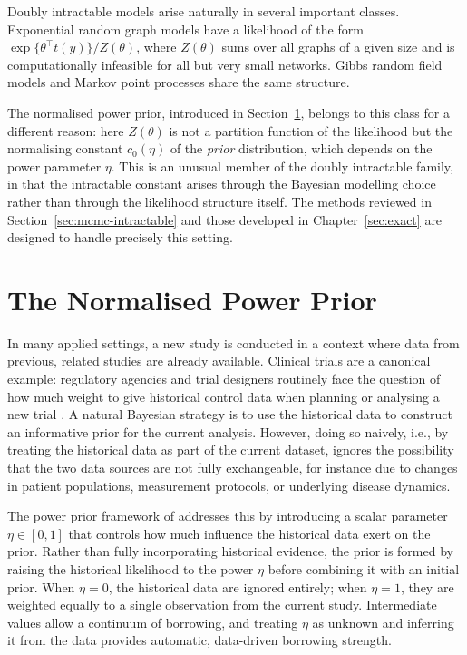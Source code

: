 Doubly intractable models arise naturally in several important classes.
Exponential random graph models have a likelihood of the form $\exp\{\theta^\top t(y)\} / Z(\theta)$,
where $Z(\theta)$ sums over all graphs of a given size and is computationally infeasible
for all but very small networks.
Gibbs random field models and Markov point processes share the same structure.

The normalised power prior, introduced in Section~\ref{sec:npp}, belongs to this class
for a different reason: here $Z(\theta)$ is not a partition function of the likelihood but
the normalising constant $c_0(\eta)$ of the \textit{prior} distribution, which depends on
the power parameter $\eta$.
This is an unusual member of the doubly intractable family, in that the intractable
constant arises through the Bayesian modelling choice rather than through the likelihood
structure itself.
The methods reviewed in Section~\ref{sec:mcmc-intractable} and those developed in Chapter~\ref{sec:exact} are designed to handle precisely this setting.

\section{The Normalised Power Prior}
\label{sec:npp}

In many applied settings, a new study is conducted in a context where data from previous, related studies are already available.
Clinical trials are a canonical example: regulatory agencies and trial designers routinely face the question of how much weight to give historical control data when planning or analysing a new trial \cite{spiegelhalter2004, ibrahim2015}.
A natural Bayesian strategy is to use the historical data to construct an informative prior for the current analysis.
However, doing so naively, i.e., by treating the historical data as part of the current dataset, ignores the possibility that the two data sources are not fully exchangeable, for instance due to changes in patient populations, measurement protocols, or underlying disease dynamics.

The power prior framework of  addresses this by introducing a scalar parameter $\eta \in [0,1]$ that controls how much influence the historical data exert on the prior.
Rather than fully incorporating historical evidence, the prior is formed by raising the historical likelihood to the power $\eta$ before combining it with an initial prior.
When $\eta = 0$, the historical data are ignored entirely; when $\eta = 1$, they are weighted equally to a single observation from the current study.
Intermediate values allow a continuum of borrowing, and treating $\eta$ as unknown and inferring it from the data provides automatic, data-driven borrowing strength.

